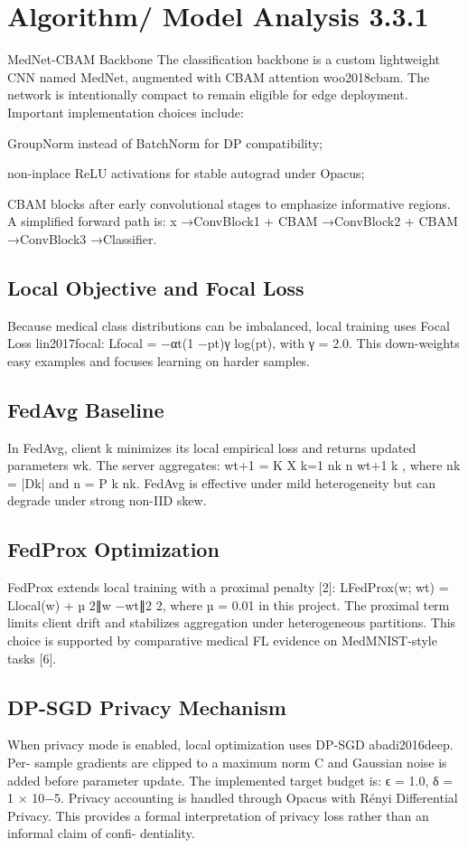 \section{Algorithm/ Model Analysis 3.3.1}
MedNet-CBAM Backbone
The classification backbone is a custom lightweight CNN named MedNet, augmented with CBAM attention woo2018cbam. The network is intentionally compact to remain eligible for edge deployment. Important implementation choices include:
\item GroupNorm instead of BatchNorm for DP compatibility;
\item non-inplace ReLU activations for stable autograd under Opacus;
\item CBAM blocks after early convolutional stages to emphasize informative regions.
A simplified forward path is:
x →ConvBlock1 + CBAM →ConvBlock2 + CBAM →ConvBlock3 →Classifier.

\subsection{Local Objective and Focal Loss}
Because medical class distributions can be imbalanced, local training uses Focal Loss lin2017focal:
Lfocal = −αt(1 −pt)γ log(pt), with γ = 2.0. This down-weights easy examples and focuses learning on harder samples.
\subsection{FedAvg Baseline}
In FedAvg, client k minimizes its local empirical loss and returns updated parameters wk. The server aggregates:
wt+1 =
K
X k=1 nk n wt+1 k
, where nk = |Dk| and n = P k nk. FedAvg is effective under mild heterogeneity but can degrade under strong non-IID skew.
\subsection{FedProx Optimization}
FedProx extends local training with a proximal penalty [2]:
LFedProx(w; wt) = Llocal(w) + µ 2∥w −wt∥2 2, where µ = 0.01 in this project. The proximal term limits client drift and stabilizes aggregation under heterogeneous partitions. This choice is supported by comparative medical FL evidence on MedMNIST-style tasks [6].

\subsection{DP-SGD Privacy Mechanism}
When privacy mode is enabled, local optimization uses DP-SGD abadi2016deep. Per- sample gradients are clipped to a maximum norm C and Gaussian noise is added before parameter update. The implemented target budget is:
ϵ = 1.0, δ = 1 × 10−5.
Privacy accounting is handled through Opacus with Rényi Differential Privacy. This provides a formal interpretation of privacy loss rather than an informal claim of confi- dentiality.
